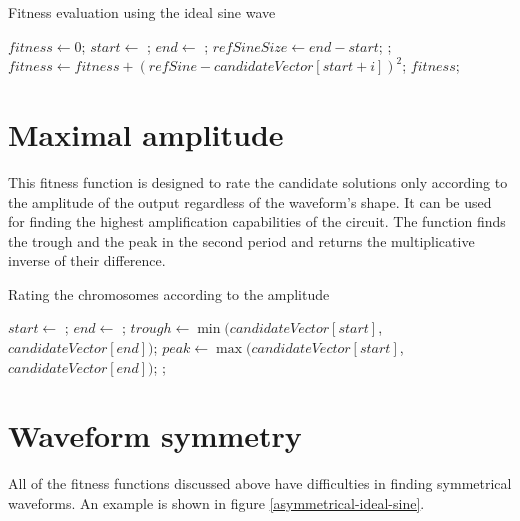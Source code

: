 \begin{algorithm}[H]
\caption{Fitness evaluation using the ideal sine wave}
\label{idealSine}
\begin{algorithmic}[1]
        \State $fitness \gets 0$;
        \State $start \gets$ ;
        \State $end \gets$ ;
        \State $refSineSize \gets end - start$;
           \State {};
           \State $fitness \gets fitness + (refSine - candidateVector[start + i])^2$;
        \EndFor
        \State \Return $fitness$;
    \EndFunction
\end{algorithmic}
\end{algorithm}

\section{Maximal amplitude}
This fitness function is designed to rate the candidate solutions only according to the amplitude of the output regardless of the waveform's shape. It can be used for finding the highest amplification capabilities of the circuit. The function finds the trough and the peak in the second period and returns the multiplicative inverse of their difference.

\begin{algorithm}[H]
\caption{Rating the chromosomes according to the amplitude}
\label{maxAmp}
\begin{algorithmic}[1]
        \State $start \gets$ ;
        \State $end \gets$ ;
        \State $trough \gets \min(candidateVector[start]$, $candidateVector[end])$;
        \State $peak \gets \max(candidateVector[start]$, $candidateVector[end])$;
        \State \Return {};
    \EndFunction
\end{algorithmic}
\end{algorithm}

\section{Waveform symmetry}
All of the fitness functions discussed above have difficulties in finding symmetrical waveforms. An example is shown in figure \ref{asymmetrical-ideal-sine}.


